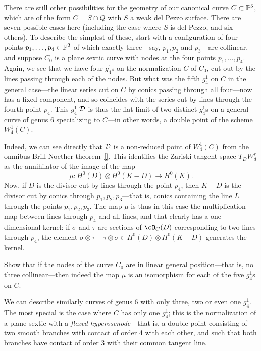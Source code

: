 There are still other possibilities for the geometry of our canonical curve $C \subset \PP^5$, which are of the form $C = S \cap Q$ with $S$ a weak del Pezzo surface. There are seven possible cases here (including the case where $S$ is del Pezzo, and six others). To describe the simplest of these, start with a configuration of four points  $p_1,\dots,p_4 \in \PP^2$ of which exactly three---say, $p_1,p_2$ and $p_3$---are collinear, and suppose $C_0$ is a plane sextic curve with nodes at the four points  $p_1,\dots,p_4$. Again, we see that we have four $g^1_4$s on the normalization $C$ of $C_0$, cut out by the lines passing through each of the nodes. But what was the fifth $g^1_4$ on $C$ in the general case---the linear series cut on $C$ by conics passing through all four---now has a fixed component, and so coincides with the series cut by lines through the fourth point $p_4$. This $g^1_4$ $\cD$ is thus the flat limit of two distinct $g^1_4$s on a general curve of genus 6 specializing to $C$---in other words, a double point of the scheme $W^1_4(C)$.

Indeed, we can see directly that $\cD$ is a non-reduced point of $W^1_4(C)$ from the omnibus Brill-Noether theorem~\ref{}. This identifies the Zariski tangent space $T_DW^r_d$ as the annihilator of the image of the map
$$
\mu : H^0(D) \otimes H^0(K-D) \to H^0(K).
$$
Now, if $D$ is the divisor cut by lines through the point $p_4$, then $K-D$ is the divisor cut by conics through $p_1,p_2,p_3$---that is, conics containing the line $L$ through the points $p_1,p_2,p_3$. The map $\mu$ is thus in this case the multiplication map between lines through $p_4$ and all lines, and that clearly has a one-dimensional kernel: if $\sigma$ and $\tau$ are sections of $\cO_C(D)$ corresponding to two lines through $p_4$, the element $\sigma \otimes \tau - \tau \otimes \sigma \in H^0(D) \otimes H^0(K-D)$ generates the kernel.

\begin{exercise}
Show that if the nodes of the curve $C_0$ are in linear general position---that is, no three collinear---then indeed the map $\mu$ is an isomorphism for each of the five $g^1_4$s on $C$.
\end{exercise}

We can describe similarly curves of genus 6 with only three, two or even one $g^1_4$. The most special is the case where $C$ has only one $g^1_4$; this is the normalization of a plane sextic with a \emph{flexed hyperoscnode}---that is, a double point consisting of two smooth branches with contact of order 4 with each other, and such that both branches have contact of order 3 with their common tangent line.

